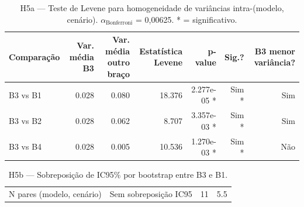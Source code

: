 \begin{table}[htbp]
\centering
\caption{H5a — Teste de Levene para homogeneidade de variâncias intra-(modelo, cenário). $\alpha_\text{Bonferroni}$ = 0{,}00625. * = significativo.}
\label{tab:t7_h5a_levene}
\small
\begin{tabular}{lrrrrrr}
\toprule
Comparação & Var. média B3 & Var. média outro braço & Estatística Levene & p-value & Sig.? & B3 menor variância? \\
\midrule
B3 vs B1 & 0.028 & 0.080 & 18.376 & 2.277e-05 * & Sim * & Sim \\
B3 vs B2 & 0.028 & 0.062 & 8.707 & 3.357e-03 * & Sim * & Sim \\
B3 vs B4 & 0.028 & 0.005 & 10.536 & 1.270e-03 * & Sim * & Não \\
\bottomrule
\end{tabular}
\end{table}

\begin{table}[htbp]
\centering
\caption{H5b — Sobreposição de IC95\% por bootstrap entre B3 e B1.}
\label{tab:t7_h5b_bootstrap}
\small
\begin{tabular}{rrlp{6cm}}
\toprule
N pares (modelo, cenário) & Sem sobreposição IC95%
\midrule
200 & 11 & 5.5%
\bottomrule
\end{tabular}
\end{table}
